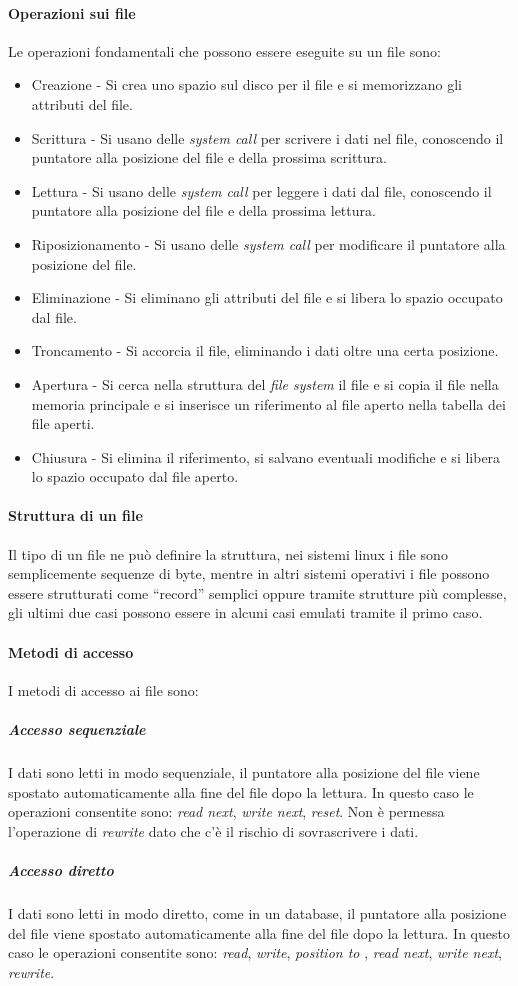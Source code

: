     \paragraph{Operazioni sui file} Le operazioni fondamentali che possono essere eseguite su un file sono:
    \begin{itemize}
        \item Creazione - Si crea uno spazio sul disco per il file e si memorizzano gli attributi del file.
        \item Scrittura - Si usano delle \textit{system call} per scrivere i dati nel file, conoscendo il puntatore alla posizione del file e della prossima scrittura.
        \item Lettura - Si usano delle \textit{system call} per leggere i dati dal file, conoscendo il puntatore alla posizione del file e della prossima lettura.
        \item Riposizionamento - Si usano delle \textit{system call} per modificare il puntatore alla posizione del file.
        \item Eliminazione - Si eliminano gli attributi del file e si libera lo spazio occupato dal file.
        \item Troncamento - Si accorcia il file, eliminando i dati oltre una certa posizione.
        \item Apertura - Si cerca nella struttura del \textit{file system} il file e si copia il file nella memoria principale e si inserisce un riferimento al file aperto nella tabella dei file aperti.
        \item Chiusura - Si elimina il riferimento, si salvano eventuali modifiche e si libera lo spazio occupato dal file aperto.
    \end{itemize}
    \paragraph{Struttura di un file} Il tipo di un file ne può definire la struttura, nei sistemi linux i file sono semplicemente sequenze di byte, mentre in altri sistemi operativi i file possono essere strutturati come ``record'' semplici oppure tramite strutture più complesse, gli ultimi due casi possono essere in alcuni casi emulati tramite il primo caso.
    \paragraph{Metodi di accesso} I metodi di accesso ai file sono:
    \subparagraph{Accesso sequenziale} I dati sono letti in modo sequenziale, il puntatore alla posizione del file viene spostato automaticamente alla fine del file dopo la lettura. In questo caso le operazioni consentite sono: \textit{read next}, \textit{write next}, \textit{reset}. Non è permessa l'operazione di \textit{rewrite} dato che c'è il rischio di sovrascrivere i dati.
    \subparagraph{Accesso diretto} I dati sono letti in modo diretto, come in un database, il puntatore alla posizione del file viene spostato automaticamente alla fine del file dopo la lettura. In questo caso le operazioni consentite sono: \textit{read}, \textit{write}, \textit{position to }, \textit{read next}, \textit{write next}, \textit{rewrite}.
